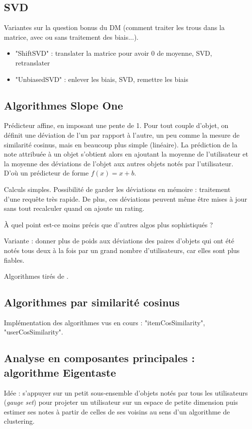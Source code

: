 	\subsection{SVD}
		Variantes sur la question bonus du DM (comment traiter les trous dans la matrice, avec ou sans traitement des biais...).
		\begin{itemize}
			\item{"ShiftSVD" : translater la matrice pour avoir $0$ de moyenne, SVD, retranslater}
			\item{"UnbiasedSVD" : enlever les biais, SVD, remettre les biais}
		\end{itemize}
	\subsection{Algorithmes Slope One}
		Prédicteur affine, en imposant une pente de 1. Pour tout couple d'objet, on définit une déviation de l'un par rapport à l'autre, un peu comme la mesure de similarité cosinus, mais en beaucoup plus simple (linéaire). La prédiction de la note attribuée à un objet s'obtient alors en ajoutant la moyenne de l'utilisateur et la moyenne des déviations de l'objet aux autres objets notés par l'utilisateur. D'où un prédicteur de forme $f(x)=x+b$.
	
		
		
		Calculs simples. Possibilité de garder les déviations en mémoire : traitement d'une requête très rapide. De plus, ces déviations peuvent même être mises à jour sans tout recalculer quand on ajoute un rating.
		
		\`A quel point est-ce moins précis que d'autres algos plus sophistiqués ?
		
		Variante : donner plus de poids aux déviations des paires d'objets qui ont été notés tous deux à la fois par un grand nombre d'utilisateurs, car elles sont plus fiables.
		
		Algorithmes tirés de \cite{Lemire2007}.
	\subsection{Algorithmes par similarité cosinus}
		Implémentation des algorithmes vus en cours : "itemCosSimilarity", "userCosSimilarity".
		
	\subsection{Analyse en composantes principales : algorithme Eigentaste}
		Idée : s'appuyer sur un petit sous-ensemble d'objets notés par tous les utilisateurs (\emph{gauge set}) pour projeter un utilisateur sur un espace de petite dimension puis estimer ses notes à partir de celles de ses voisins au sens d'un algorithme de clustering.
		
